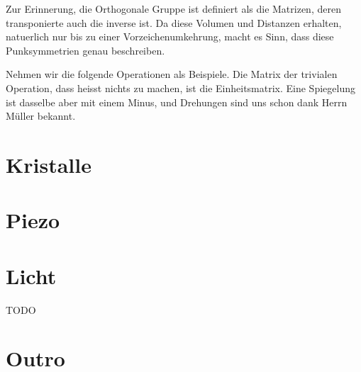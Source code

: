 \documentclass[a4paper]{article}
\newcommand{\scene}[1]{\par\noindent[ #1 ]\par}
\begin{document}
Zur Erinnerung, die Orthogonale Gruppe ist definiert als die Matrizen, deren
transponierte auch die inverse ist. Da diese Volumen und Distanzen erhalten,
natuerlich nur bis zu einer Vorzeichenumkehrung, macht es Sinn, dass diese
Punksymmetrien genau beschreiben.

Nehmen wir die folgende Operationen als Beispiele. Die Matrix der trivialen
Operation, dass heisst nichts zu machen, ist die Einheitsmatrix. Eine
Spiegelung ist dasselbe aber mit einem Minus, und Drehungen sind uns schon
dank Herrn M\"uller bekannt.

\section{Kristalle}
\scene{Spontan}

\section{Piezo}
\scene{Spontan}

\section{Licht}
TODO

\section{Outro}
\scene{Camera}
\end{document}
